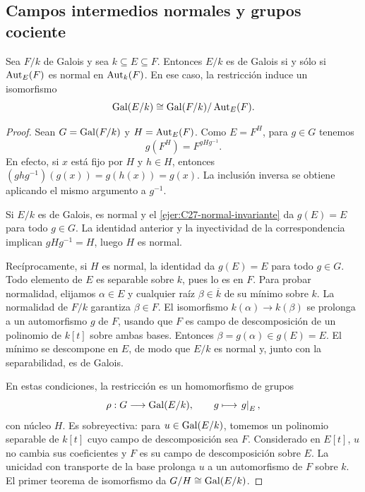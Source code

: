 \subsection{Campos intermedios normales y grupos cociente}\label{tema:27-4-0a}
\begin{teo}\label{teo:C27-cociente}
Sea $F/k$ de Galois y sea $k\subseteq E\subseteq F$. Entonces $E/k$ es de Galois si y sólo si $\operatorname{Aut}_E(F)$ es normal en $\operatorname{Aut}_k(F)$. En ese caso, la restricción induce un isomorfismo
\[
\operatorname{Gal}(E/k)\cong\operatorname{Gal}(F/k)/\operatorname{Aut}_E(F).
\]
\end{teo}
\begin{proof}
Sean $G=\operatorname{Gal}(F/k)$ y $H=\operatorname{Aut}_E(F)$. Como $E=F^H$, para $g\in G$ tenemos
\[
g(F^H)=F^{gHg^{-1}}.
\]
En efecto, si $x$ está fijo por $H$ y $h\in H$, entonces $(ghg^{-1})(g(x))=g(h(x))=g(x)$. La inclusión inversa se obtiene aplicando el mismo argumento a $g^{-1}$.

Si $E/k$ es de Galois, es normal y el \cref{ejer:C27-normal-invariante} da $g(E)=E$ para todo $g\in G$. La identidad anterior y la inyectividad de la correspondencia implican $gHg^{-1}=H$, luego $H$ es normal.

Recíprocamente, si $H$ es normal, la identidad da $g(E)=E$ para todo $g\in G$. Todo elemento de $E$ es separable sobre $k$, pues lo es en $F$. Para probar normalidad, elijamos $\alpha\in E$ y cualquier raíz $\beta\in\overline k$ de su mínimo sobre $k$. La normalidad de $F/k$ garantiza $\beta\in F$. El isomorfismo $k(\alpha)\to k(\beta)$ se prolonga a un automorfismo $g$ de $F$, usando que $F$ es campo de descomposición de un polinomio de $k[t]$ sobre ambas bases. Entonces $\beta=g(\alpha)\in g(E)=E$. El mínimo se descompone en $E$, de modo que $E/k$ es normal y, junto con la separabilidad, es de Galois.

En estas condiciones, la restricción es un homomorfismo de grupos
\[
\rho:G\longrightarrow\operatorname{Gal}(E/k),\qquad g\longmapsto\left.g\right|_{E},
\]
con núcleo $H$. Es sobreyectiva: para $u\in\operatorname{Gal}(E/k)$, tomemos un polinomio separable de $k[t]$ cuyo campo de descomposición sea $F$. Considerado en $E[t]$, $u$ no cambia sus coeficientes y $F$ es su campo de descomposición sobre $E$. La unicidad con transporte de la base prolonga $u$ a un automorfismo de $F$ sobre $k$. El primer teorema de isomorfismo da $G/H\cong\operatorname{Gal}(E/k)$.
\end{proof}
